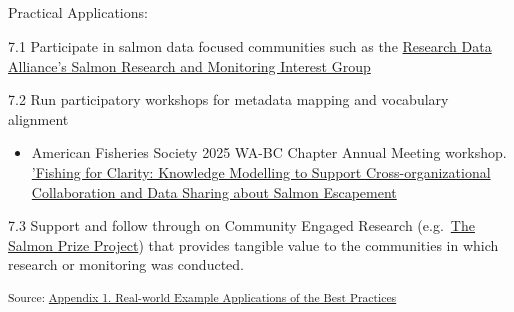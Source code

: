\documentclass[
  letterpaper,
  DIV=11,
  numbers=noendperiod]{scrartcl}
\makeatletter
\let\oldsubparagraph\subparagraph
\renewcommand{\subparagraph}{
    \@ifstar
      \xxxSubParagraphStar
      \xxxSubParagraphNoStar
  }
\newcommand{\xxxSubParagraphStar}[1]{\oldsubparagraph*{#1}\mbox{}}
\newcommand{\xxxSubParagraphNoStar}[1]{\oldsubparagraph{#1}\mbox{}}
\providecommand{\tightlist}{%
  \setlength{\itemsep}{0pt}\setlength{\parskip}{0pt}}\usepackage{longtable,booktabs,array}
\makeatother
\begin{document}
\subparagraph{Practical Applications:}\label{practical-applications-6}

7.1 Participate in salmon data focused communities such as the
\href{https://www.rd-alliance.org/groups/salmon-research-and-monitoring-ig/}{Research
Data Alliance's Salmon Research and Monitoring Interest Group}~

7.2 Run participatory workshops for metadata mapping and vocabulary
alignment

\begin{itemize}
\tightlist
\item
  American Fisheries Society 2025 WA-BC Chapter Annual Meeting workshop.
  \href{https://pnamp.org/event/workshop-fishing-for-clarity-knowledge-modeling-to-support-cross-organizational-collaboration-and-data-sharing-about-salmon-escapement/}{'Fishing
  for Clarity: Knowledge Modelling to Support Cross-organizational
  Collaboration and Data Sharing about Salmon Escapement}
\end{itemize}

7.3 Support and follow through on Community Engaged Research
(e.g.~\href{https://salmonprize.com}{The Salmon Prize Project}) that
provides tangible value to the communities in which research or
monitoring was conducted.

\textsubscript{Source:
\href{https://br-johnson.github.io/sdm-paper/appendices/appendix-1-real-world-examples-preview.html\#bc325a05-c217-4f06-9278-5c192e4ff65a}{Appendix
1. Real-world Example Applications of the Best Practices}}
\end{document}
